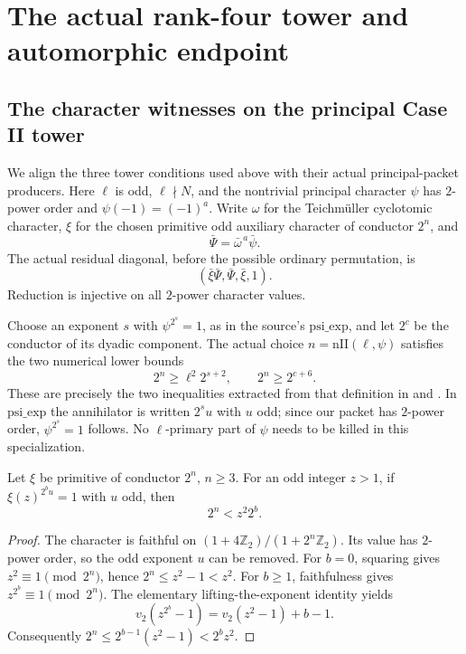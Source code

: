 \section{The actual rank-four tower and automorphic endpoint}
\label{sec:sr-rank-four-actual-endpoint}

\subsection{The character witnesses on the principal Case II tower}
\label{subsec:sr-case-two-tower-witnesses}
We align the three tower conditions used above with their
actual principal-packet producers.
Here \(\ell\) is odd, \(\ell\nmid N\), and the nontrivial
principal character \(\psi\) has \(2\)-power order and
\(\psi(-1)=(-1)^a\).
Write \(\omega\) for the Teichm\"uller cyclotomic character,
\(\xi\) for the chosen primitive odd auxiliary character
of conductor \(2^n\), and
\[
            \bar\Psi=\bar\omega^{\,a}\bar\psi .
 \tag{T1}
\]
The actual residual diagonal, before the possible
ordinary permutation, is
\[
                  (\bar\xi\bar\Psi,\bar\Psi,\bar\xi,1).
 \tag{T2}
\]
Reduction is injective on all \(2\)-power character values.

Choose an exponent \(s\) with \(\psi^{2^s}=1\), as in
the source's \(\mathrm{psi\_exp}\), and let \(2^c\)
be the conductor of its dyadic component.
The actual choice \(n=\mathrm{nII}(\ell,\psi)\)
satisfies the two numerical lower bounds
\[
       2^n\ge\ell^2 2^{s+2},
                   \qquad 2^n\ge2^{c+6}.
 \tag{T3}
\]
These are precisely the two inequalities extracted from
that definition in
and
.
In \(\mathrm{psi\_exp}\) the annihilator is written
\(2^s u\) with \(u\) odd; since our packet has \(2\)-power
order, \(\psi^{2^s}=1\) follows.
No \(\ell\)-primary part of \(\psi\) needs to be killed
in this specialization.

\begin{srlemma}\label{lem:sr-primitive-dyadic-frobenius}
Let \(\xi\) be primitive of conductor \(2^n\), \(n\ge3\).
For an odd integer \(z>1\), if
\(\xi(z)^{2^b u}=1\) with \(u\) odd, then
\[
                              2^n<z^2 2^b .
 \tag{T4}
\]
\end{srlemma}
\begin{proof}
The character is faithful on
\((1+4\mathbb Z_2)/(1+2^n\mathbb Z_2)\).
Its value has \(2\)-power order, so the odd exponent
\(u\) can be removed.
For \(b=0\), squaring gives
\(z^2\equiv1\pmod{2^n}\), hence
\(2^n\le z^2-1<z^2\).
For \(b\ge1\), faithfulness gives
\(z^{2^b}\equiv1\pmod{2^n}\).
The elementary lifting-the-exponent identity yields
\[
 v_2(z^{2^b}-1)=v_2(z^2-1)+b-1.
\]
Consequently
\(2^n\le2^{b-1}(z^2-1)<2^b z^2\).
\end{proof}

